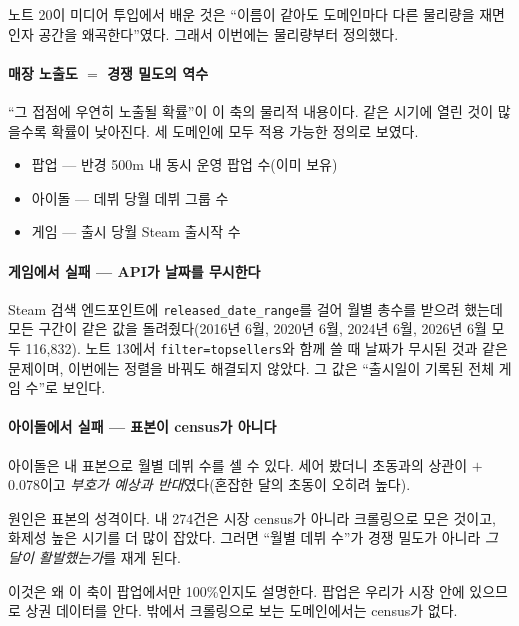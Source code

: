 \documentclass[10pt]{article}
\begin{document}
노트 20이 미디어 투입에서 배운 것은 ``이름이 같아도 도메인마다 다른 물리량을 재면
인자 공간을 왜곡한다''였다. 그래서 이번에는 물리량부터 정의했다.

\paragraph{매장 노출도 $=$ 경쟁 밀도의 역수}
``그 접점에 우연히 노출될 확률''이 이 축의 물리적 내용이다. 같은 시기에 열린 것이
많을수록 확률이 낮아진다. 세 도메인에 모두 적용 가능한 정의로 보였다.

\begin{itemize}[leftmargin=1.1em,itemsep=0.15em]
\item 팝업 --- 반경 500m 내 동시 운영 팝업 수(이미 보유)
\item 아이돌 --- 데뷔 당월 데뷔 그룹 수
\item 게임 --- 출시 당월 Steam 출시작 수
\end{itemize}

\paragraph{게임에서 실패 --- API가 날짜를 무시한다}
Steam 검색 엔드포인트에 \texttt{released\_date\_range}를 걸어 월별 총수를
받으려 했는데 모든 구간이 같은 값을 돌려줬다(2016년 6월, 2020년 6월, 2024년 6월,
2026년 6월 모두 116,832). 노트 13에서 \texttt{filter=topsellers}와 함께 쓸 때
날짜가 무시된 것과 같은 문제이며, 이번에는 정렬을 바꿔도 해결되지 않았다.
그 값은 ``출시일이 기록된 전체 게임 수''로 보인다.

\paragraph{아이돌에서 실패 --- 표본이 census가 아니다}
아이돌은 내 표본으로 월별 데뷔 수를 셀 수 있다. 세어 봤더니 초동과의 상관이
$+$0.078이고 \emph{부호가 예상과 반대}였다(혼잡한 달의 초동이 오히려 높다).

원인은 표본의 성격이다. 내 274건은 시장 census가 아니라 크롤링으로 모은 것이고,
화제성 높은 시기를 더 많이 잡았다. 그러면 ``월별 데뷔 수''가 경쟁 밀도가 아니라
\emph{그 달이 활발했는가}를 재게 된다.


이것은 왜 이 축이 팝업에서만 100\%인지도 설명한다. 팝업은 우리가 시장 안에
있으므로 상권 데이터를 안다. 밖에서 크롤링으로 보는 도메인에서는 census가 없다.
\end{document}
